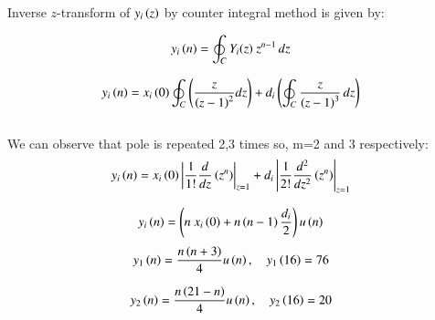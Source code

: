 \documentclass[beamer]{IEEEtran}
\theoremstyle{remark}
\begin{document}
Inverse $z$-transform of $y_i\left(z\right)$ by counter integral method is given by:

\begin{align}
y_i\left(n\right)&=\oint_C Y_i(z)\ z^{n-1}\, dz
\end{align}

\begin{align}
    y_i\left(n\right)&=x_i\left(0\right)\oint_C \left(\frac{z}{\left(z-1\right)^2}dz\right) + d_i\left(\oint_C  \frac{z}{\left(z-1\right)^3} \, dz\right)
\end{align}\\

We can observe that pole is repeated 2,3 times so, m=2 and 3 respectively:\\
\begin{align}
    y_i\left(n\right)&=x_i\left(0\right)\left|\frac{1}{1!}\frac{d}{dz}\left(z^n\right)\right|_{z=1} + d_i\left|\frac{1}{2!}\frac{d^2}{dz^2}\left(z^n\right)\right|_{z=1}
\end{align}

\begin{align}
    y_i\left(n\right)&=\left(n\ x_i\left(0\right) + n\left(n-1\right)\frac{d_i}{2}\right)u\left(n\right)
\end{align}
\begin{align}
\label{39}
    y_1\left(n\right)&=\frac{n\left(n+3\right)}{4}u\left(n\right),\quad y_1\left(16\right)=76
\end{align}

\begin{align}
\label{40}
    y_2\left(n\right)&=\frac{n\left(21-n\right)}{4}u\left(n\right),\quad y_2\left(16\right)=20
\end{align}
\end{document}
